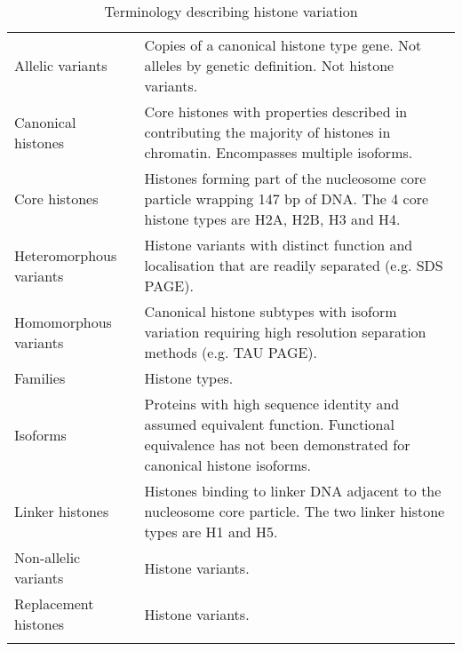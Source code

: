   \begin{table*}
    \caption{Terminology describing histone variation}
    \label{tab:histone-divisions}
    \centering
    \begin{tabular}{F p{\dimexpr(\textwidth--4\tabcolsep)}}
      \toprule
      Allelic variants &
      Copies of a canonical histone type gene. Not alleles by genetic definition. Not histone variants. \\
      \addlinespace

      Canonical histones &
      Core histones with properties described in 
      contributing the majority of histones in chromatin.
      Encompasses multiple isoforms. \\
      \addlinespace

      Core histones &
      Histones forming part of the nucleosome core particle wrapping 147 bp of DNA.
      The 4 core histone types are H2A, H2B, H3 and H4. \\
      \addlinespace

      Heteromorphous variants &
      Histone variants with distinct function and localisation that are readily separated (e.g. SDS PAGE).\\
      \addlinespace

      Homomorphous variants &
      Canonical histone subtypes with isoform variation
      requiring high resolution separation methods (e.g. TAU PAGE).\\
      \addlinespace

      Families &
      Histone types.\\
      \addlinespace

      Isoforms &
      Proteins with high sequence identity and assumed equivalent function.
      Functional equivalence has not been demonstrated for canonical histone isoforms.\\
      \addlinespace

      Linker histones &
      Histones binding to linker DNA adjacent to the nucleosome core particle.
      The two linker histone types are H1 and H5.\\
      \addlinespace

      Non-allelic variants &
      Histone variants. \\
      \addlinespace

      Replacement histones &
      Histone variants. \\
      \addlinespace


\end{tabular}
\end{table*}
